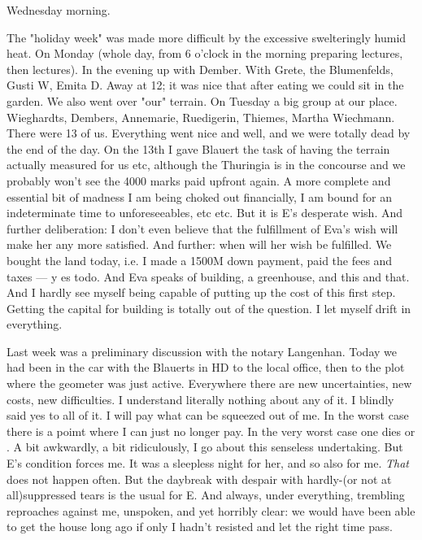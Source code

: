 Wednesday morning.

The "holiday week" was made more difficult by the excessive swelteringly humid heat. \missing On Monday (whole day, from 6 o'clock in the morning preparing lectures, then lectures). In the evening up with Dember. With Grete, the Blumenfelds, Gusti W, Emita D. Away at 12; it was nice that after eating we could sit in the garden. We also went over "our" terrain. 
\missing On Tuesday a big group at our place. Wieghardts, Dembers, Annemarie, Ruedigerin, Thiemes, Martha Wiechmann.
There were 13 of us. Everything went nice and well, and we were totally dead by the end of the day.
On the 13th I gave Blauert the task of having the terrain actually measured for us etc, although the Thuringia is in the concourse and we probably won't see the 4000 marks paid upfront again.
A more complete and essential bit of madness I am being choked out financially, I am bound for an indeterminate time to unforeseeables, etc  etc. But it is E's desperate wish. And further deliberation: I don't even believe that the fulfillment of Eva's wish will make her any more satisfied. And further: when will her wish be fulfilled. We bought the land today, i.e. I made a 1500M down payment, paid the fees and taxes — y es todo. And Eva speaks of building, a greenhouse, and this and that. And I hardly see myself being capable of putting up the cost of this first step. Getting the capital for building is totally out of the question.  I let myself drift in everything.

Last week was a preliminary discussion with the notary Langenhan. Today we had been in the car with the Blauerts in HD to the local office, then to the plot where the geometer was just active. Everywhere there are new uncertainties, new costs, new difficulties. I understand literally nothing about any of it. I blindly said yes to all of it. I will pay what can be squeezed out of me. In the worst case there is a poimt where I can just no longer pay. In the very worst case one dies or . 
A bit awkwardly, a bit ridiculously, I go about this senseless undertaking. But E's condition forces me. It was a sleepless night for her, and so also for me. \textit{That} does not happen often. But the daybreak with despair with hardly-(or not at all)suppressed tears is the usual for E. And always, under everything, trembling reproaches against me, unspoken, and yet horribly clear: we would have been able to get the house long ago if only I hadn't resisted and let the right time pass.

\missing